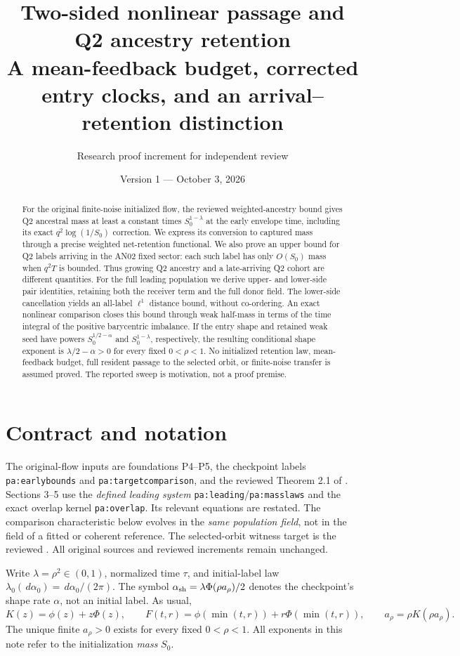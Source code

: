 \documentclass[11pt]{article}
\title{Two-sided nonlinear passage and Q2 ancestry retention\\
\large A mean-feedback budget, corrected entry clocks, and an arrival--retention distinction}
\author{Research proof increment for independent review}
\date{Version 1 --- October 3, 2026}
\numberwithin{equation}{section}
\theoremstyle{remark}\newtheorem{remark}[theorem]{Remark}
\newcommand{\dd}{\,d}
\newcommand{\1}{\mathbf 1}
\begin{document}
\maketitle
\begin{abstract}
For the original finite-noise initialized flow, the reviewed weighted-ancestry
bound gives Q2 ancestral mass at least a constant times
$S_0^{1-\lambda}$ at the early envelope time, including its exact
$q^2\log(1/S_0)$ correction. We express its conversion to captured mass
through a precise weighted net-retention functional. We also prove an
upper bound for Q2 labels arriving in the AN02 fixed sector: each such
label has only $O(S_0)$ mass when $q^2T$ is bounded. Thus growing Q2
ancestry and a late-arriving Q2 cohort are different quantities.
For the full leading population we derive upper- and lower-side pair
identities, retaining both the receiver term and the full donor field.
The lower-side cancellation yields an all-label $\ell^1$ distance bound,
without co-ordering. An exact nonlinear comparison closes this bound
through weak half-mass in terms of the time integral of the positive
barycentric imbalance. If the entry shape and retained weak seed have
powers $S_0^{1/2-\alpha}$ and $S_0^{1-\lambda}$, respectively, the resulting
conditional shape exponent is $\lambda/2-\alpha>0$ for every fixed
$0<\rho<1$. No initialized retention law, mean-feedback budget, full
resident passage to the selected orbit, or finite-noise transfer is
assumed proved. The reported sweep is motivation, not a proof premise.
\end{abstract}

\section{Contract and notation}\label{inc:AN03:ret:v1:contract}
The original-flow inputs are foundations P4--P5, the checkpoint labels
\texttt{pa:earlybounds} and \texttt{pa:targetcomparison}, and the reviewed
Theorem 2.1 of .
Sections 3--5 use the \emph{defined leading system}
\texttt{pa:leading}/\texttt{pa:masslaws} and the exact overlap kernel
\texttt{pa:overlap}. Its relevant equations are restated. The comparison
characteristic below evolves in the \emph{same population field}, not
in the field of a fitted or coherent reference. The selected-orbit witness
target is the reviewed .
All original sources and reviewed increments remain unchanged.

Write $\lambda=\rho^2\in(0,1)$, normalized time $\tau$, and initial-label
law $\lambda_0(\dd\alpha_0)=\dd\alpha_0/(2\pi)$. The symbol
$\alpha_{\rm sh}=\lambda\Phi(\rho a_\rho)/2$ denotes the checkpoint's
shape rate $\alpha$, not an initial label. As usual,
\[
 K(z)=\phi(z)+z\Phi(z),\qquad
 F(t,r)=\phi(\min(t,r))+r\Phi(\min(t,r)),\qquad
 a_\rho=\rho K(\rho a_\rho).
\]
The unique finite $a_\rho>0$ exists for every fixed $0<\rho<1$.
All exponents in this note refer to the initialization \emph{mass} $S_0$.
\end{document}

